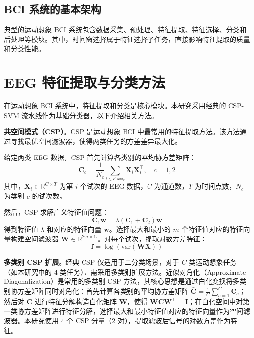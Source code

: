 \subsection{BCI 系统的基本架构}
\label{subsec:bci_architecture}

典型的运动想象 BCI 系统包含数据采集、预处理、特征提取、特征选择、分类和后处理等模块\cite{tangermann2012review}。其中，时间窗选择属于特征选择子任务，直接影响特征提取的质量和分类性能。

\section{EEG 特征提取与分类方法}
\label{sec:feature_classification}

在运动想象 BCI 系统中，特征提取和分类是核心模块\cite{lotte2007review}。本研究采用经典的 CSP-SVM 流水线作为基础分类器，以下介绍相关方法。

\textbf{共空间模式（CSP）}。CSP 是运动想象 BCI 中最常用的特征提取方法\cite{blankertz2008optimizing}。该方法通过寻找最优空间滤波器，使得两类任务的方差差异最大化。

给定两类 EEG 数据，CSP 首先计算各类别的平均协方差矩阵：
\begin{equation}
\mathbf{C}_c = \frac{1}{N_c} \sum_{i \in \text{class}_c} \mathbf{X}_i \mathbf{X}_i^\top, \quad c = 1, 2
\end{equation}
其中，$\mathbf{X}_i \in \mathbb{R}^{C \times T}$ 为第 $i$ 个试次的 EEG 数据，$C$ 为通道数，$T$ 为时间点数，$N_c$ 为类别 $c$ 的试次数\cite{blankertz2008optimizing}。

然后，CSP 求解广义特征值问题：
\begin{equation}
\mathbf{C}_1 \mathbf{w} = \lambda (\mathbf{C}_1 + \mathbf{C}_2) \mathbf{w}
\end{equation}
得到特征值 $\lambda$ 和对应的特征向量 $\mathbf{w}$\cite{blankertz2008optimizing}。选择最大和最小的 $m$ 个特征值对应的特征向量构建空间滤波器 $\mathbf{W} \in \mathbb{R}^{2m \times C}$。对每个试次，提取对数方差特征：
\begin{equation}
\mathbf{f} = \log \left( \text{var}(\mathbf{W} \mathbf{X}) \right)
\end{equation}

\textbf{多类别 CSP 扩展}。经典 CSP 仅适用于二分类场景，对于 $C$ 类运动想象任务（如本研究中的 4 类任务），需采用多类别扩展方法\cite{blankertz2008optimizing}。近似对角化（Approximate Diagonalization）是常用的多类别 CSP 方法，其核心思想是通过白化变换将多类别协方差矩阵同时对角化：首先计算各类别的平均协方差矩阵 $\bar{\mathbf{C}} = \frac{1}{C}\sum_{c=1}^{C} \mathbf{C}_c$；然后对 $\bar{\mathbf{C}}$ 进行特征分解构造白化矩阵 $\mathbf{W}$，使得 $\mathbf{W} \bar{\mathbf{C}} \mathbf{W}^{\top} = \mathbf{I}$；在白化空间中对第一类协方差矩阵进行特征分解，选择最大和最小特征值对应的特征向量作为空间滤波器。本研究使用 4 个 CSP 分量（2 对），提取滤波后信号的对数方差作为特征。

